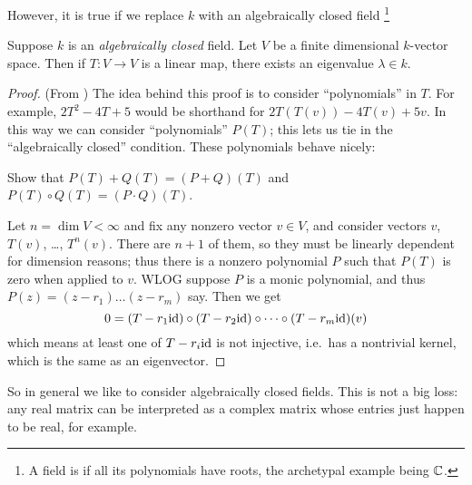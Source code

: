However, it is true if we replace $k$ with an algebraically closed field
\footnote{A field is  if all its
polynomials have roots, the archetypal example being $\mathbb C$.}
\begin{theorem}
	Suppose $k$ is an \emph{algebraically closed} field.
	Let $V$ be a finite dimensional $k$-vector space.
	Then if $T \colon V \to V$ is a linear map,
	there exists an eigenvalue $\lambda \in k$.
\end{theorem}
\begin{proof}
	(From \cite{ref:axler})
	The idea behind this proof is to consider ``polynomials'' in $T$.
	For example, $2T^2-4T+5$ would be shorthand for $2T(T(v)) - 4T(v) + 5v$.
	In this way we can consider ``polynomials'' $P(T)$;
	this lets us tie in the ``algebraically closed'' condition.
	These polynomials behave nicely:
	\begin{ques}
		Show that $P(T)+Q(T) = (P+Q)(T)$ and $P(T) \circ Q(T) = (P \cdot Q)(T)$.
	\end{ques}

	Let $n = \dim V < \infty$ and fix any nonzero vector $v \in V$,
	and consider vectors $v$, $T(v)$, \dots, $T^n (v)$.
	There are $n+1$ of them,
	so they must be linearly dependent for dimension reasons;
	thus there is a nonzero polynomial $P$ such that $P(T)$
	is zero when applied to $v$.
	WLOG suppose $P$ is a monic polynomial,
	and thus $P(z) = (z-r_1)\dots(z-r_m)$ say.
	Then we get
	\[ 0 = (T - r_1 \mathrm{id}) \circ (T - r_2 \mathrm{id}) \circ \dots
		\circ (T - r_m \mathrm{id})(v) \]
	which means at least one of $T - r_i \mathrm{id}$ is not injective,
	i.e.\ has a nontrivial kernel,
	which is the same as an eigenvector.
\end{proof}
So in general we like to consider algebraically closed fields.
This is not a big loss:
any real matrix can be interpreted as a complex matrix
whose entries just happen to be real, for example.

